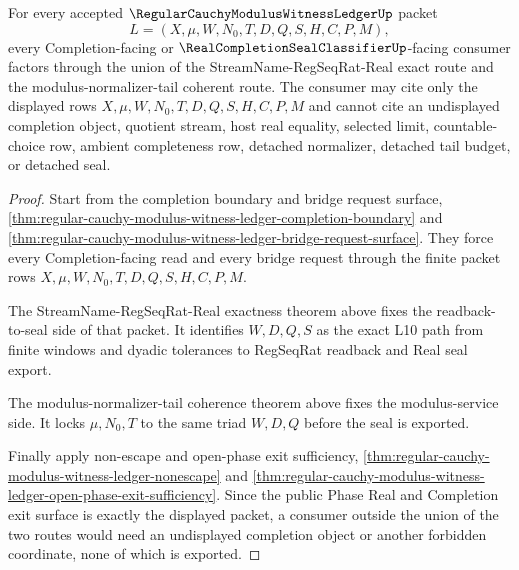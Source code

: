 \begin{theorem}
\label{thm:regular-cauchy-modulus-witness-ledger-completion-consumer-boundary}
For every accepted $\RegularCauchyModulusWitnessLedgerUp$ packet
$$
L=(X,\mu,W,N_0,T,D,Q,S,H,C,P,M),
$$
every Completion-facing or $\RealCompletionSealClassifierUp$-facing consumer factors through the union of the StreamName-RegSeqRat-Real exact route and the modulus-normalizer-tail coherent route. The consumer may cite only the displayed rows $X,\mu,W,N_0,T,D,Q,S,H,C,P,M$ and cannot cite an undisplayed completion object, quotient stream, host real equality, selected limit, countable-choice row, ambient completeness row, detached normalizer, detached tail budget, or detached seal.
\end{theorem}
\begin{proof}
Start from the completion boundary and bridge request surface, \autoref{thm:regular-cauchy-modulus-witness-ledger-completion-boundary} and \autoref{thm:regular-cauchy-modulus-witness-ledger-bridge-request-surface}. They force every Completion-facing read and every bridge request through the finite packet rows $X,\mu,W,N_0,T,D,Q,S,H,C,P,M$.

The StreamName-RegSeqRat-Real exactness theorem above fixes the readback-to-seal side of that packet. It identifies $W,D,Q,S$ as the exact L10 path from finite windows and dyadic tolerances to RegSeqRat readback and Real seal export.

The modulus-normalizer-tail coherence theorem above fixes the modulus-service side. It locks $\mu,N_0,T$ to the same triad $W,D,Q$ before the seal is exported.

Finally apply non-escape and open-phase exit sufficiency, \autoref{thm:regular-cauchy-modulus-witness-ledger-nonescape} and \autoref{thm:regular-cauchy-modulus-witness-ledger-open-phase-exit-sufficiency}. Since the public Phase Real and Completion exit surface is exactly the displayed packet, a consumer outside the union of the two routes would need an undisplayed completion object or another forbidden coordinate, none of which is exported.
\end{proof}

